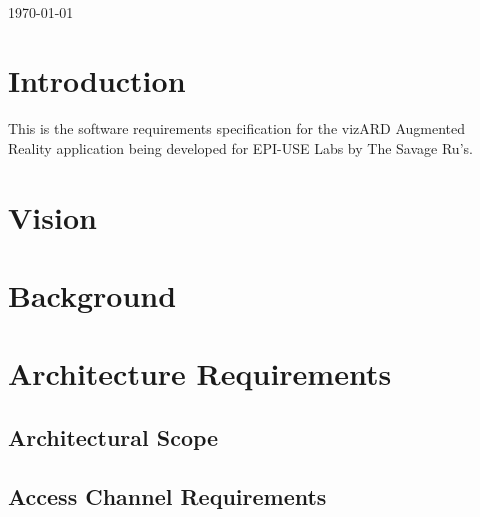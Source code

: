 \documentclass[a4paper,12pt]{article}
\begin{document}
\begin{titlepage}
\begin{minipage}{0.4\textwidth}
\begin{flushright}
\end{flushright}
\end{minipage}\\[4cm]



{\large \today}\\[3cm] %

 

\vfill %

\end{titlepage}

\newpage

\tableofcontents

\newpage

\section{Introduction}

This is the software requirements specification for the vizARD Augmented Reality application being developed for EPI-USE Labs by The Savage Ru's.

\newpage
\section{Vision}

\newpage
\section{Background}

\newpage
\section{Architecture Requirements}

\subsection{Architectural Scope}

\subsection{Access Channel Requirements}
\end{document}
